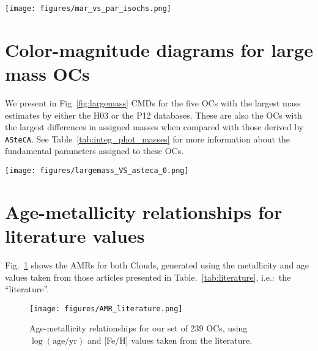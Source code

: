 \documentclass{aa}
\begin{document}
\begin{appendix}
\begin{figure*}
\texttt{[image: figures/mar\_vs\_par\_isochs.png]}
\caption{\cite{Marigo_2008} versus PARSEC~\citep{Bressan_2012} isochrones, for
different metallicities and ages.}
\label{fig:marig_parsec}
\end{figure*}
\clearpage




\section{Color-magnitude diagrams for large mass OCs}
\label{apdx:largemass}

We present in Fig~\ref{fig:largemass} CMDs for the five OCs with the largest
mass estimates by either the H03 or the P12 databases. These are also the OCs
with the largest differences in assigned masses when compared with those derived
by \texttt{ASteCA}.
See Table~\ref{tab:integ_phot_masses} for more information about the fundamental
parameters assigned to these OCs.

\begin{figure*}
\texttt{[image: figures/largemass\_VS\_asteca\_0.png]}
\caption{CMDs for the OCs with the largest masses assigned by H03 and/or P12.
The best match synthetic cluster is plotted to the right, and the observed
cluster region CMD to the left, for each OC.}
\label{fig:largemass}
\end{figure*}
\clearpage





\section{Age-metallicity relationships for literature values}
\label{apdx:amr_lit}

Fig.~\ref{fig:amr_lit} shows the AMRs for both Clouds, generated using the
metallicity and age values taken from those articles presented in
Table.~\ref{tab:literature}, i.e.:~the ``literature''.
%
\begin{figure}
\centering
\texttt{[image: figures/AMR\_literature.png]}
\caption{Age-metallicity relationships for our set of 239 OCs, using
$\log\mathrm{(age/yr)}$ and [Fe/H] values taken from the literature.}
\label{fig:amr_lit}
\end{figure}


\end{appendix}
\end{document}
